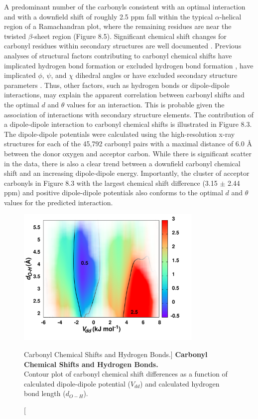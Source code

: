 \begin{doublespace}
A predominant number of the carbonyls consistent with an optimal \npistar{}
interaction and with a downfield shift of roughly 2.5 ppm fall within the
typical $\alpha$-helical region of a Ramachandran plot, where the remaining
residues are near the twisted $\beta$-sheet region (Figure 8.5). Significant
chemical shift changes for carbonyl residues within
secondary structures are well documented \cite{wang:protsci2002}.
Previous analyses of structural factors contributing to carbonyl \cnmr{}
chemical shifts have implicated hydrogen bond formation
\cite{dedios:sci1993,asakawa:jacs1992,wylie:jacs2007}
or excluded hydrogen bond formation
\cite{cisnetti:cpc2004,neal:jbnmr2003,markwick:jacs2004}, have
implicated $\phi$, $\psi$, and $\chi$ dihedral angles
\cite{neal:jbnmr2003} or have excluded secondary structure parameters
\cite{cisnetti:cpc2004,dedios:sci1993}. Thus, other factors,
such as hydrogen bonds or dipole-dipole interactions, may explain the apparent
correlation between carbonyl \cnmr{} shifts and the optimal $d$ and $\theta$
values for an \npistar{} interaction. This is probable given the association of
\npistar{} interactions with secondary structure elements. The contribution of
a dipole-dipole interaction to carbonyl \cnmr{} chemical shifts is illustrated
in Figure 8.3. The dipole-dipole potentials were calculated using the
high-resolution x-ray structures for each of the 45,792 carbonyl pairs with a
maximal distance of 6.0 \r{A} between the donor oxygen and acceptor carbon.
While there is significant scatter in the data, there is also a clear trend
between a downfield carbonyl \cnmr{} chemical shift and an increasing
dipole-dipole energy. Importantly, the cluster of acceptor carbonyls in
Figure 8.3 with the largest \cnmr{} chemical shift difference
(3.15 $\pm$ 2.44 ppm) and positive dipole-dipole potentials also conforms to
the optimal $d$ and $\theta$ values for the predicted \npistar{} interaction.
\end{doublespace}

\begin{figure}
\includegraphics[width=3.5in]{figs/npistar/06.png}
\caption
      [Carbonyl \cnmr{} Chemical Shifts and Hydrogen Bonds.]{
  {\bf Carbonyl \cnmr{} Chemical Shifts and Hydrogen Bonds.}
  \\
  Contour plot of \cnmr{} carbonyl chemical shift differences as a function
  of calculated dipole-dipole potential ($V_{dd}$) and calculated hydrogen
  bond length ($d_{O-H}$).
}
\end{figure}

